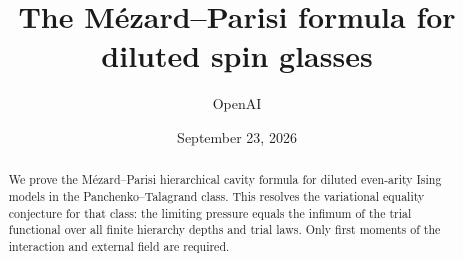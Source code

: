 \documentclass[11pt]{article}
\title{The M\'ezard--Parisi formula for diluted spin glasses}
\author{OpenAI}
\date{September 23, 2026}
\numberwithin{equation}{section}
\theoremstyle{definition}
\theoremstyle{remark}
\begin{document}
\maketitle
\begin{abstract}
We prove the M\'ezard--Parisi hierarchical cavity formula for diluted
even-arity Ising models in the Panchenko--Talagrand class. This resolves
the variational equality conjecture for that class: the limiting pressure
equals the infimum of the trial functional over all finite hierarchy depths
and trial laws. Only first moments of the interaction and external field
are required.
\end{abstract}













\end{document}

